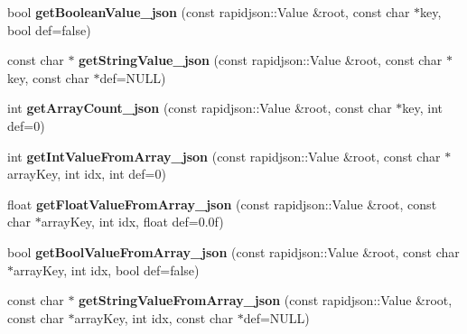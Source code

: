 \begin{DoxyCompactItemize}
\item 
\mbox{\label{classcocostudio_1_1DictionaryHelper_a381c2d9dfc9c3048034751c8559ec871}} 
bool {\bfseries get\+Boolean\+Value\+\_\+json} (const rapidjson\+::\+Value \&root, const char $\ast$key, bool def=false)
\item 
\mbox{\label{classcocostudio_1_1DictionaryHelper_ab9abb547dae438472d43dc5b0a453f01}} 
const char $\ast$ {\bfseries get\+String\+Value\+\_\+json} (const rapidjson\+::\+Value \&root, const char $\ast$key, const char $\ast$def=N\+U\+LL)
\item 
\mbox{\label{classcocostudio_1_1DictionaryHelper_ac168e7100d9fa43549ca6f418464df18}} 
int {\bfseries get\+Array\+Count\+\_\+json} (const rapidjson\+::\+Value \&root, const char $\ast$key, int def=0)
\item 
\mbox{\label{classcocostudio_1_1DictionaryHelper_ad1a8821281e091b1cf4edd944d54816c}} 
int {\bfseries get\+Int\+Value\+From\+Array\+\_\+json} (const rapidjson\+::\+Value \&root, const char $\ast$array\+Key, int idx, int def=0)
\item 
\mbox{\label{classcocostudio_1_1DictionaryHelper_a1f6d26bf7b84e5db0c892b9563c3460b}} 
float {\bfseries get\+Float\+Value\+From\+Array\+\_\+json} (const rapidjson\+::\+Value \&root, const char $\ast$array\+Key, int idx, float def=0.\+0f)
\item 
\mbox{\label{classcocostudio_1_1DictionaryHelper_a818c93c71f1318cdefb131720f114bf7}} 
bool {\bfseries get\+Bool\+Value\+From\+Array\+\_\+json} (const rapidjson\+::\+Value \&root, const char $\ast$array\+Key, int idx, bool def=false)
\item 
\mbox{\label{classcocostudio_1_1DictionaryHelper_abe082d9c6bfd0778140ad2b65ce65b64}} 
const char $\ast$ {\bfseries get\+String\+Value\+From\+Array\+\_\+json} (const rapidjson\+::\+Value \&root, const char $\ast$array\+Key, int idx, const char $\ast$def=N\+U\+LL)
\item 
\mbox{\label{classcocostudio_1_1DictionaryHelper_a78f8343ce649cf20d76ff5abf78ec0af}} 

\end{DoxyCompactItemize}
